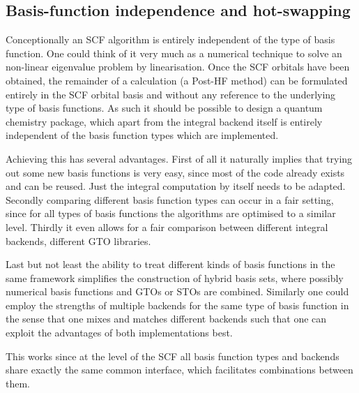 
%


\subsection{Basis-function independence and hot-swapping}
Conceptionally an SCF algorithm is entirely independent of the type of basis function.
One could think of it very much as a numerical technique to solve
an non-linear eigenvalue problem by linearisation.
Once the SCF orbitals have been obtained,
the remainder of a calculation (\eg a Post-HF method)
can be formulated entirely in the SCF orbital basis
and without any reference to the underlying type of basis functions.
As such it should be possible to design a quantum chemistry package,
which apart from the integral backend itself is entirely independent
of the basis function types which are implemented.

Achieving this has several advantages.
First of all it naturally implies that trying out some new basis functions is very easy,
since most of the code already exists and can be reused.
Just the integral computation by itself needs to be adapted.
Secondly comparing different basis function types can occur in a fair setting,
since for all types of basis functions the algorithms are optimised to a similar level.
Thirdly it even allows for a fair comparison between different integral backends,
\eg different GTO libraries.

Last but not least the ability to treat different kinds of basis functions
in the same framework simplifies the construction of hybrid basis sets,
where possibly numerical basis functions and GTOs or STOs are combined.
Similarly one could employ the strengths of multiple backends for the same type of basis function
in the sense that one mixes and matches different backends such that one can exploit
the advantages of both implementations best.

This works since at the level of the SCF all basis function types and backends
share exactly the same common interface,
which facilitates combinations between them.

